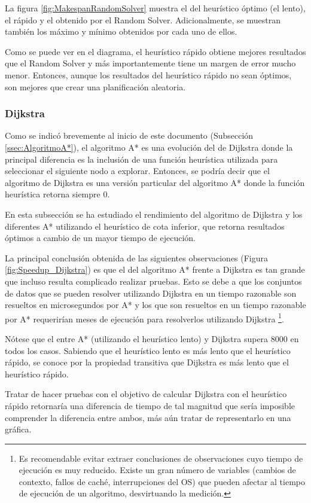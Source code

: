 La figura \ref{fig:MakespanRandomSolver} muestra el 
del heurístico óptimo (el lento), el rápido y el obtenido
por el Random Solver.
Adicionalmente, se muestran también los 
máximo y mínimo obtenidos por cada uno de ellos.

Como se puede ver en el diagrama, el heurístico rápido obtiene mejores
resultados que el Random Solver y más importantemente tiene un
margen de error mucho menor.
Entonces, aunque los resultados del heurístico rápido no
sean óptimos, son mejores que crear una planificación aleatoria.

\pagebreak
\subsubsection{Dijkstra}
\label{sec:ComparativaDijkstra}

Como se indicó brevemente al inicio de este documento (Subsección \ref{ssec:AlgoritmoA*}),
el algoritmo A* es una evolución del de Dijkstra
donde la principal diferencia es la inclusión de una función
heurística utilizada para seleccionar el siguiente nodo a explorar.
Entonces, se podría decir que el algoritmo de Dijkstra es una
versión particular del algoritmo A* donde la función heurística
retorna siempre 0.

En esta subsección se ha estudiado el rendimiento del algoritmo de Dijkstra
y los diferentes A* utilizando el heurístico de cota inferior,
que retorna resultados óptimos a cambio de un mayor tiempo de ejecución.

La principal conclusión obtenida de las siguientes observaciones 
(Figura \ref{fig:Speedup_Dijkstra}) es que el 
del algoritmo A* frente a Dijkstra
es tan grande que incluso resulta complicado realizar pruebas.
Esto se debe a que los conjuntos de datos que se pueden
resolver utilizando Dijkstra en un tiempo razonable son resueltos
en microsegundos por A* y los que son resueltos en un tiempo
razonable por A* requerirían meses de ejecución para resolverlos
utilizando Dijkstra
\footnote{
    Es recomendable evitar extraer conclusiones de observaciones cuyo tiempo de ejecución es muy reducido.
    Existe un gran número de variables (cambios de contexto, fallos de caché, interrupciones del OS)
    que pueden afectar al tiempo de ejecución de un algoritmo,
    desvirtuando la medición.
}.

\begin{notebox}
    Nótese que el  entre A* (utilizando el heurístico lento)
    y Dijkstra supera 8000 en todos los casos.
    Sabiendo que el heurístico lento es más lento que el heurístico rápido,
    se conoce por la propiedad transitiva que Dijkstra es más lento
    que el heurístico rápido.

    Tratar de hacer pruebas con el objetivo de calcular Dijkstra con el heurístico
    rápido retornaría una diferencia de tiempo de tal magnitud que sería
    imposible comprender la diferencia entre ambos,
    más aún tratar de representarlo en una gráfica.
\end{notebox}

